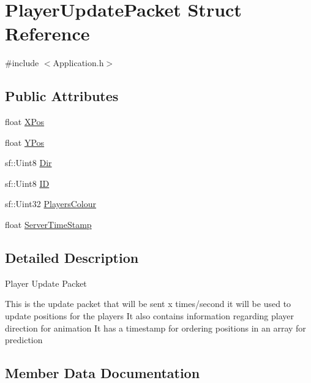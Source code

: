 \hypertarget{struct_player_update_packet}{}\section{Player\+Update\+Packet Struct Reference}
\label{struct_player_update_packet}


{\ttfamily \#include $<$Application.\+h$>$}

\subsection*{Public Attributes}
\begin{DoxyCompactItemize}
\item 
float \hyperlink{struct_player_update_packet_ad656b9b8f778c5271075196bb684c16a}{X\+Pos}
\item 
float \hyperlink{struct_player_update_packet_ab585017bc89d8c48dcbc3ad46c2986e9}{Y\+Pos}
\item 
sf\+::\+Uint8 \hyperlink{struct_player_update_packet_a1957c3e7b3d479db302c3d97f4250cfd}{Dir}
\item 
sf\+::\+Uint8 \hyperlink{struct_player_update_packet_ad89ec5382255970ef4c072c39162cf81}{ID}
\item 
sf\+::\+Uint32 \hyperlink{struct_player_update_packet_a1fff66955a58ace71c581e906d2cb501}{Players\+Colour}
\item 
float \hyperlink{struct_player_update_packet_ab6cfba614a9285162fa733ee3e058664}{Server\+Time\+Stamp}
\end{DoxyCompactItemize}


\subsection{Detailed Description}
Player Update Packet

This is the update packet that will be sent x times/second it will be used to update positions for the players It also contains information regarding player direction for animation It has a timestamp for ordering positions in an array for prediction 

\subsection{Member Data Documentation}
\hypertarget{struct_player_update_packet_a1957c3e7b3d479db302c3d97f4250cfd}{}\label{struct_player_update_packet_a1957c3e7b3d479db302c3d97f4250cfd} 
